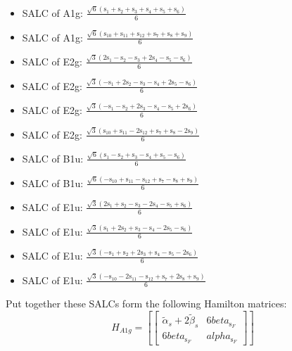 \documentclass[12pt,a4paper]{article}
\begin{document}
\begin{itemize}
\item SALC of A1g: \quad $\frac{\sqrt{6} \left(\text{s}_{1} + \text{s}_{2} + \text{s}_{3} + \text{s}_{4} + \text{s}_{5} + \text{s}_{6}\right)}{6}$
\item SALC of A1g: \quad $\frac{\sqrt{6} \left(\text{s}_{10} + \text{s}_{11} + \text{s}_{12} + \text{s}_{7} + \text{s}_{8} + \text{s}_{9}\right)}{6}$
\item SALC of E2g: \quad $\frac{\sqrt{3} \left(2 \text{s}_{1} - \text{s}_{2} - \text{s}_{3} + 2 \text{s}_{4} - \text{s}_{5} - \text{s}_{6}\right)}{6}$
\item SALC of E2g: \quad $\frac{\sqrt{3} \left(- \text{s}_{1} + 2 \text{s}_{2} - \text{s}_{3} - \text{s}_{4} + 2 \text{s}_{5} - \text{s}_{6}\right)}{6}$
\item SALC of E2g: \quad $\frac{\sqrt{3} \left(- \text{s}_{1} - \text{s}_{2} + 2 \text{s}_{3} - \text{s}_{4} - \text{s}_{5} + 2 \text{s}_{6}\right)}{6}$
\item SALC of E2g: \quad $\frac{\sqrt{3} \left(\text{s}_{10} + \text{s}_{11} - 2 \text{s}_{12} + \text{s}_{7} + \text{s}_{8} - 2 \text{s}_{9}\right)}{6}$
\item SALC of B1u: \quad $\frac{\sqrt{6} \left(\text{s}_{1} - \text{s}_{2} + \text{s}_{3} - \text{s}_{4} + \text{s}_{5} - \text{s}_{6}\right)}{6}$
\item SALC of B1u: \quad $\frac{\sqrt{6} \left(- \text{s}_{10} + \text{s}_{11} - \text{s}_{12} + \text{s}_{7} - \text{s}_{8} + \text{s}_{9}\right)}{6}$
\item SALC of E1u: \quad $\frac{\sqrt{3} \left(2 \text{s}_{1} + \text{s}_{2} - \text{s}_{3} - 2 \text{s}_{4} - \text{s}_{5} + \text{s}_{6}\right)}{6}$
\item SALC of E1u: \quad $\frac{\sqrt{3} \left(\text{s}_{1} + 2 \text{s}_{2} + \text{s}_{3} - \text{s}_{4} - 2 \text{s}_{5} - \text{s}_{6}\right)}{6}$
\item SALC of E1u: \quad $\frac{\sqrt{3} \left(- \text{s}_{1} + \text{s}_{2} + 2 \text{s}_{3} + \text{s}_{4} - \text{s}_{5} - 2 \text{s}_{6}\right)}{6}$
\item SALC of E1u: \quad $\frac{\sqrt{3} \left(- \text{s}_{10} - 2 \text{s}_{11} - \text{s}_{12} + \text{s}_{7} + 2 \text{s}_{8} + \text{s}_{9}\right)}{6}$
\end{itemize}
Put together these SALCs form the following Hamilton matrices:
     $$ H_{A1g}= \left[\begin{bmatrix}\tilde{\alpha}_{s} + 2 \tilde{\beta}_{s} & 6 beta_{\text{s}_F}\\6 beta_{\text{s}_F} & alpha_{\text{s}_F}\end{bmatrix}\right]$$ 
\end{document}
